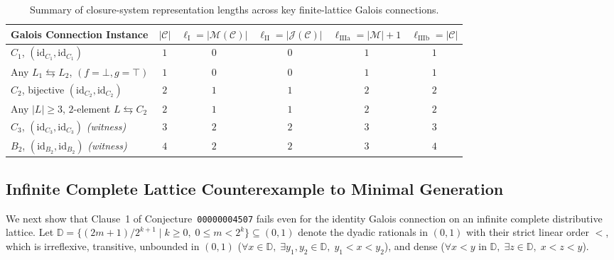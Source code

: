 \documentclass[11pt,a4paper]{article}
\theoremstyle{definition}
\theoremstyle{remark}
\begin{document}
\begin{table}[ht]
\centering
\small
\setlength{\tabcolsep}{4.5pt}
\renewcommand{\arraystretch}{1.2}
\begin{tabular}{lccccc}
\hline
\textbf{Galois Connection Instance} & $|\mathcal{C}|$ & $\ell_{\mathrm{I}} = |\mathcal{M}(\mathcal{C})|$ & $\ell_{\mathrm{II}} = |\mathcal{J}(\mathcal{C})|$ & $\ell_{\mathrm{IIIa}} = |\mathcal{M}|+1$ & $\ell_{\mathrm{IIIb}} = |\mathcal{C}|$ \\
\hline
$C_1$, $(\mathrm{id}_{C_1}, \mathrm{id}_{C_1})$ & $1$ & $0$ & $0$ & $1$ & $1$ \\
Any $L_1 \leftrightarrows L_2$, $(f=\bot, g=\top)$ & $1$ & $0$ & $0$ & $1$ & $1$ \\
$C_2$, bijective $(\mathrm{id}_{C_2}, \mathrm{id}_{C_2})$ & $2$ & $1$ & $1$ & $2$ & $2$ \\
Any $|L| \ge 3$, $2$-element $L \leftrightarrows C_2$ & $2$ & $1$ & $1$ & $2$ & $2$ \\
$C_3$, $(\mathrm{id}_{C_3}, \mathrm{id}_{C_3})$ \emph{(witness)} & $3$ & $2$ & $2$ & $3$ & $3$ \\
$B_2$, $(\mathrm{id}_{B_2}, \mathrm{id}_{B_2})$ \emph{(witness)} & $4$ & $2$ & $2$ & $3$ & $4$ \\
\hline
\end{tabular}
\caption{Summary of closure-system representation lengths across key finite-lattice Galois connections.}
\label{tab:summary}
\end{table}

\subsection{Infinite Complete Lattice Counterexample to Minimal Generation}

We next show that Clause~1 of Conjecture~\texttt{00000004507} fails even for the identity Galois connection on an infinite complete distributive lattice. Let $\mathbb{D} = \{ (2m+1)/2^{k+1} \mid k \ge 0,\; 0 \le m < 2^k \} \subseteq (0, 1)$ denote the dyadic rationals in $(0, 1)$ with their strict linear order $<$, which is irreflexive, transitive, unbounded in $(0,1)$ ($\forall x \in \mathbb{D},\; \exists y_1, y_2 \in \mathbb{D},\; y_1 < x < y_2$), and dense ($\forall x < y \text{ in } \mathbb{D},\; \exists z \in \mathbb{D},\; x < z < y$).
\end{document}
